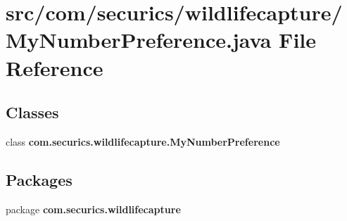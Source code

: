 \section{src/com/securics/wildlifecapture/\+My\+Number\+Preference.java File Reference}
\label{_my_number_preference_8java}
\subsection*{Classes}
\begin{DoxyCompactItemize}
\item 
class {\bf com.\+securics.\+wildlifecapture.\+My\+Number\+Preference}
\end{DoxyCompactItemize}
\subsection*{Packages}
\begin{DoxyCompactItemize}
\item 
package {\bf com.\+securics.\+wildlifecapture}
\end{DoxyCompactItemize}
